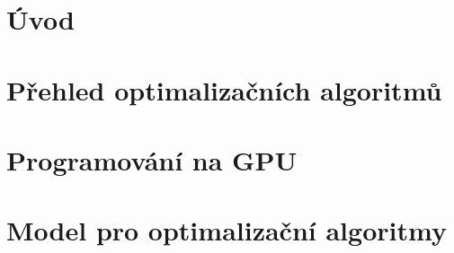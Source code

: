 \documentclass[oneside,11pt,a4paper]{report}
\newif\ifrelease %
\theoremstyle{plain}
\begin{document}
\ifrelease
\fi
    \newpage
    \tableofcontents

    \chapter*{Úvod}
        

    \chapter{Přehled optimalizačních algoritmů}
        

    \chapter{Programování na GPU}
        

    \chapter{Model pro optimalizační algoritmy}
        





    
\end{document}
